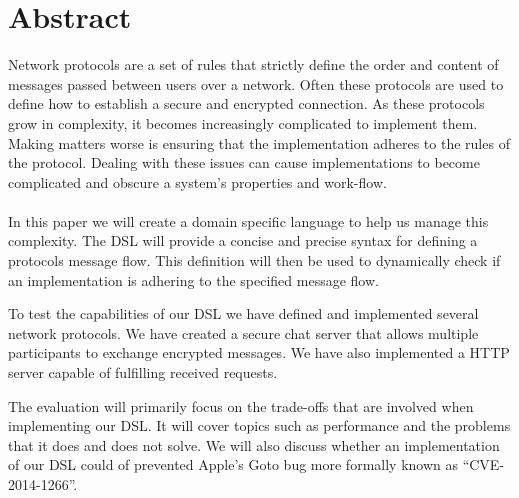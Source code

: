 \section*{Abstract}
Network protocols are a set of rules that strictly define the order and content of messages passed between users over a network. Often these protocols are used to define how to establish a secure and encrypted connection. As these protocols grow in complexity, it becomes increasingly complicated to implement them. Making matters worse is ensuring that the implementation adheres to the rules of the protocol. Dealing with these issues can cause implementations to become complicated and obscure a system's properties and work-flow.
\\\\
In this paper we will create a domain specific language to help us manage this complexity. The DSL will provide a concise and precise syntax for defining a protocols message flow. This definition will then be used to dynamically check if an implementation is adhering to the specified message flow. 

To test the capabilities of our DSL we have defined and implemented several network protocols. We have created a secure chat server that allows multiple participants to exchange encrypted messages. We have also implemented a HTTP server capable of fulfilling received requests.

The evaluation will primarily focus on the trade-offs that are involved when implementing our DSL. It will cover topics such as performance and the problems that it does and does not solve. We will also discuss whether an implementation of our DSL could of prevented Apple's Goto bug more formally known as ``CVE-2014-1266''.
